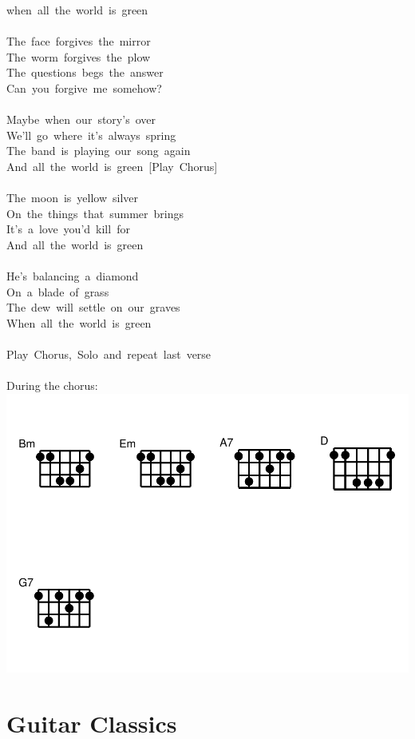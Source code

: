 \documentclass[]{book}
\begin{document}
when~all~the~world~is~green\\
~\\
The~face~forgives~the~mirror\\
The~worm~forgives~the~plow\\
The~questions~begs~the~answer\\
Can~you~forgive~me~somehow?\\
~\\
Maybe~when~our~story's~over\\
We'll~go~where~it's~always~spring\\
The~band~is~playing~our~song~again\\
And~all~the~world~is~green~{[}Play~Chorus{]}\\
~\\
The~moon~is~yellow~silver\\
On~the~things~that~summer~brings\\
It's~a~love~you'd~kill~for\\
And~all~the~world~is~green\\
~\\
He's~balancing~a~diamond\\
On~a~blade~of~grass\\
The~dew~will~settle~on~our~graves\\
When~all~the~world~is~green\\
~\\
Play~Chorus,~Solo~and~repeat~last~verse\\
~\\

During the chorus:
\includegraphics{Songs_files/figure-latex/unnamed-chunk-20-1.pdf}

\hypertarget{guitar-classics}{%
\chapter{Guitar Classics}\label{guitar-classics}}
\end{document}
